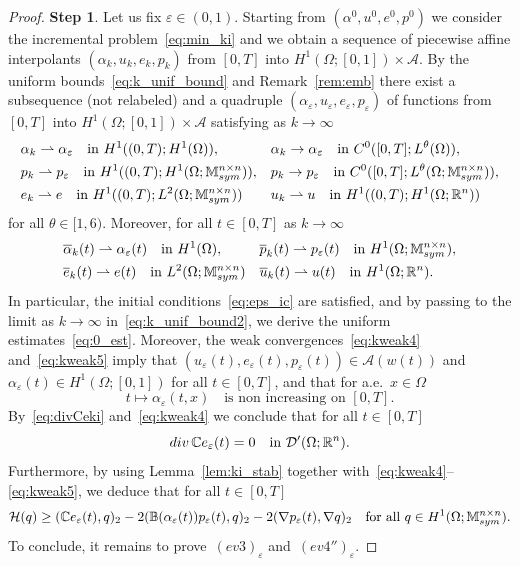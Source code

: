 \documentclass[reqno]{amsart}
\theoremstyle{definition}
\numberwithin{equation}{section}
\def\div {\mathop {\rm div}\nolimits}
\def\R {\mathbb R}
\def\M {\mathbb M^{n\times n}_{\rm sym}}
\def\C {\mathbb C}
\def\B {\mathbb B}
\begin{document}
\begin{proof}
{\bf Step 1}. Let us fix $\varepsilon\in(0,1)$. Starting from $(\alpha^0,u^0,e^0,p^0)$ we consider the incremental problem~\eqref{eq:min_ki} and we obtain a sequence of piecewise affine interpolants $(\alpha_k,u_k,e_k,p_k)$ from $[0,T]$ into $H^1(\Omega;[0,1])\times\mathcal A$. By the uniform bounds~\eqref{eq:k_unif_bound} and Remark~\ref{rem:emb} there exist a subsequence (not relabeled) and a quadruple $(\alpha_\varepsilon,u_\varepsilon,e_\varepsilon,p_\varepsilon)$ of functions from $[0,T]$ into $H^1(\Omega;[0,1])\times\mathcal A$ satisfying as $k\to\infty$
\begin{align}
&\alpha_k\rightharpoonup \alpha_\varepsilon \quad\text{in $H^1((0,T);H^1(\Omega))$},& &\alpha_k\to \alpha_\varepsilon \quad\text{in $C^0([0,T];L^\theta(\Omega))$},\label{eq:kweak1}\\
& p_k\rightharpoonup p_\varepsilon \quad\text{in $H^1((0,T);H^1(\Omega;\M))$},& &p_k\to p_\varepsilon \quad\text{in $C^0([0,T];L^\theta(\Omega;\M))$},\label{eq:kweak2}\\
&e_k\rightharpoonup e \quad\text{in $H^1((0,T);L^2(\Omega;\M))$} & &u_k\rightharpoonup u \quad\text{in $H^1((0,T);H^1(\Omega;\R^n))$}\label{eq:kweak3}
\end{align}
for all $\theta\in[1,6)$. Moreover, for all $t\in[0,T]$ as $k\to\infty$
\begin{align}
&\overline\alpha_k(t) \rightharpoonup\alpha_\varepsilon(t) \quad\text{in $H^1(\Omega)$},& & \overline p_k(t)\rightharpoonup p_\varepsilon(t) \quad\text{in $H^1(\Omega;\M)$}, \label{eq:kweak4}\\
&\overline e_k(t)\rightharpoonup e(t) \quad\text{in $L^2(\Omega;\M)$} & &\overline u_k(t)\rightharpoonup u(t)\quad\text{in $H^1(\Omega;\R^n)$}\label{eq:kweak5}.
\end{align}
In particular, the initial conditions~\eqref{eq:eps_ic} are satisfied, and by passing to the limit as $k\to\infty$ in~\eqref{eq:k_unif_bound2}, we derive the uniform estimates~\eqref{eq:0_est}. Moreover, the weak convergences~\eqref{eq:kweak4} and~\eqref{eq:kweak5} imply that $(u_\varepsilon(t),e_\varepsilon(t),p_\varepsilon(t))\in\mathcal A(w(t))$ and $\alpha_\varepsilon(t)\in H^1(\Omega;[0,1])$ for all $t\in[0,T]$, and that for a.e.\ $x\in\Omega$ 
\begin{equation*}
t\mapsto \alpha_\varepsilon(t,x)\quad\text{is non increasing on $[0,T]$}.
\end{equation*}
By~\eqref{eq:divCeki} and~\eqref{eq:kweak4} we conclude that for all $t\in[0,T]$ 
$$\div \C e_\varepsilon(t)=0\quad\text{in $\mathcal D'(\Omega;\R^n)$}.$$
Furthermore, by using Lemma~\ref{lem:ki_stab} together with~\eqref{eq:kweak4}--\eqref{eq:kweak5}, we deduce that for all $t\in[0,T]$
\begin{equation*}
\mathcal H(q)\ge (\C e_\varepsilon(t),q)_2-2(\B(\alpha_\varepsilon(t))p_\varepsilon(t),q)_2-2(\nabla p_\varepsilon(t),\nabla q)_2\quad\text{for all $q\in H^1(\Omega;\M)$}.
\end{equation*}
To conclude, it remains to prove~$(ev3)_\varepsilon$ and~$(ev4'')_\varepsilon$.


\end{proof}
\end{document}

